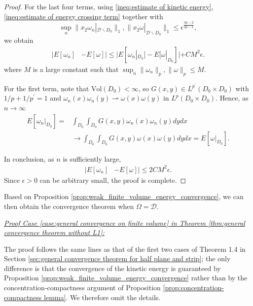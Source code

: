 \documentclass[11pt,letterpaper]{amsart}
\theoremstyle{definition}
\theoremstyle{remark}
\newcommand{\D}{\mathcal{D}}
\renewcommand{\O}{\Omega}
\renewcommand{\tt}[1]{\text{#1}}
\numberwithin{equation}{section}
\begin{document}
\begin{proof}
    For the last four terms, using \eqref{ineq:estimate of kinetic energy}, \eqref{ineq:estimate of energy crossing term} together with $$\sup_n\|x_2\omega_n|_{\mathcal{D}\backslash D_0}\|_1, \|x_2 \omega|_{\mathcal{D}\backslash D_0}\|_1\leq \epsilon^{\frac{3p-2}{2p-2}},$$ 
    we obtain
    \begin{align*}
        |E[\omega_n] & - E[\omega]| \leq |E[\omega_n|_{D_0}]-E[\omega|_{D_0}]| + C M^2\epsilon.
    \end{align*}
    where $M$ is a large constant such that $\sup_n\|\omega_n\|_{p}, \|\omega\|_{p}\leq M$.

    For the first term, note that $\tt{Vol}(D_0)<\infty$, so $G(x,y) \in L^{p^{\prime}}(D_0 \times D_0)$ with $1/p+1/{p^\prime}=1$ and $\omega_n(x)\omega_n(y) \rightharpoonup \omega(x)\omega(y)$ in $L^p(D_0 \times D_0)$. Hence, as $n\to\infty$
    \begin{align*}
        E[\omega_n|_{D_0}] = & \int_{D_0}\int_{D_0} {G}(x,y)\omega_n(x)\omega_n(y)dydx \\
        & \longrightarrow \int_{D_0}\int_{D_0} {G}(x,y)\omega(x)\omega(y)dydx = E[\omega|_{D_0}].
    \end{align*}

    In conclusion, as $n$ is sufficiently large, 
    \begin{align*}
        |E[\omega_n] & - E[\omega]| \leq 2CM^2\epsilon.
    \end{align*}
    Since $\epsilon>0$ can be arbitrary small, the proof is complete.
    
\end{proof}

Based on Proposition \ref{prop:weak_finite_volume_energy_convergence}, we can then obtain the convergence theorem when $\O=\D$.

\hspace*{\fill} 

\noindent\underline{\textit{Proof Case \ref{case:general convergence on finite volume} in Theorem \ref{thm:general convergence theorem without L1}:}}

The proof follows the same lines as that of the first two cases of Theorem 1.4 in Section \ref{sec:general convergence theorem for half plane and strip}; the only difference is that the convergence of the kinetic energy is guaranteed by Proposition \ref{prop:weak_finite_volume_energy_convergence} rather than by the concentration‑compactness argument of Proposition \ref{prop:concentration-compactness lemma}. We therefore omit the details.
\end{document}

